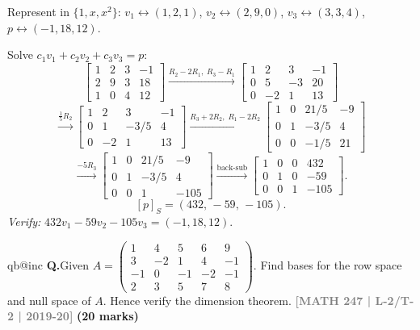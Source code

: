 \documentclass[12pt,a3paper]{article}
\makeatletter
\newcommand{\yr}[1]{\hfill\textcolor{gray}{\small\textbf{[#1]}}}
\newcommand{\mk}[1]{\textcolor{orange!70!black}{\small\textbf{(#1 marks)}}}
\newcounter{qnum}
\newcommand{\Q}[1]{%
  \csname qb@inc\endcsname
  \needspace{4\baselineskip}
  \refstepcounter{qnum}
  \vspace{6pt}
  \noindent\textbf{Q\theqnum.}\enspace #1\par
}
\makeatother
\begin{document}
\begin{tcolorbox}[enhanced,breakable,
  colback=cC!4,colframe=cC,boxrule=0.8pt,arc=5pt,
  title={\textbf{Answer --- Coordinate Vector of $p=-1+18x+12x^2$ relative to $S$}},
  fonttitle=\bfseries\color{white},colbacktitle=cC]

Represent in $\{1,x,x^2\}$: $v_1\leftrightarrow(1,2,1)$, $v_2\leftrightarrow(2,9,0)$, $v_3\leftrightarrow(3,3,4)$, $p\leftrightarrow(-1,18,12)$.

Solve $c_1 v_1+c_2 v_2+c_3 v_3=p$:
\[
\left[\begin{array}{ccc|c}1&2&3&-1\\2&9&3&18\\1&0&4&12\end{array}\right]
\xrightarrow{R_2-2R_1,\;R_3-R_1}
\left[\begin{array}{ccc|c}1&2&3&-1\\0&5&-3&20\\0&-2&1&13\end{array}\right]
\]
\[
\xrightarrow{\frac{1}{5}R_2}
\left[\begin{array}{ccc|c}1&2&3&-1\\0&1&-3/5&4\\0&-2&1&13\end{array}\right]
\xrightarrow{R_3+2R_2,\;R_1-2R_2}
\left[\begin{array}{ccc|c}1&0&21/5&-9\\0&1&-3/5&4\\0&0&-1/5&21\end{array}\right]
\]
\[
\xrightarrow{-5R_3}
\left[\begin{array}{ccc|c}1&0&21/5&-9\\0&1&-3/5&4\\0&0&1&-105\end{array}\right]
\xrightarrow{\text{back-sub}}
\left[\begin{array}{ccc|c}1&0&0&432\\0&1&0&-59\\0&0&1&-105\end{array}\right].
\]
\[
\boxed{[p]_S = (432,\,-59,\,-105).}
\]
\textit{Verify:} $432v_1-59v_2-105v_3=(-1,18,12)$.\;\checkmark

\end{tcolorbox}

\Q{Given $A = \begin{pmatrix} 1 & 4 & 5 & 6 & 9 \\ 3 & -2 & 1 & 4 & -1 \\ -1 & 0 & -1 & -2 & -1 \\ 2 & 3 & 5 & 7 & 8 \end{pmatrix}$. Find bases for the row space and null space of $A$. Hence verify the dimension theorem.
\yr{MATH 247 | L-2/T-2 | 2019-20} \mk{20}}
\end{document}
